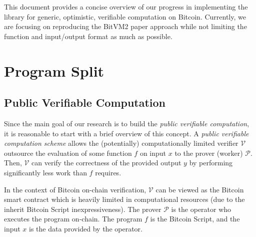 \documentclass{iacrtrans}
\begin{document}
This document provides a concise overview of our progress in implementing the library for generic, optimistic, verifiable computation on Bitcoin. Currently, we are focusing on reproducing the BitVM2 paper approach while not limiting the function and input/output format as much as possible.

\section{Program Split}\label{sec:program-splitting}

\subsection{Public Verifiable Computation}

Since the main goal of our research is to build the \textit{public verifiable computation}, it is reasonable to start with a brief overview of this concept. A \textit{public verifiable computation scheme} allows the (potentially) computationally limited verifier $\mathcal{V}$ outsource the evaluation of some function $f$ on input $x$ to the prover (worker) $\mathcal{P}$. Then, $\mathcal{V}$ can verify the correctness of the provided output $y$ by performing significantly less work than $f$ requires. 

In the context of Bitcoin on-chain verification, $\mathcal{V}$ can be viewed as the Bitcoin smart contract which is heavily limited in computational resources (due to the inherit Bitcoin Script inexpressiveness). The prover $\mathcal{P}$ is the operator who executes the program on-chain. The program $f$ is the Bitcoin Script, and the input $x$ is the data provided by the operator. 
\end{document}
